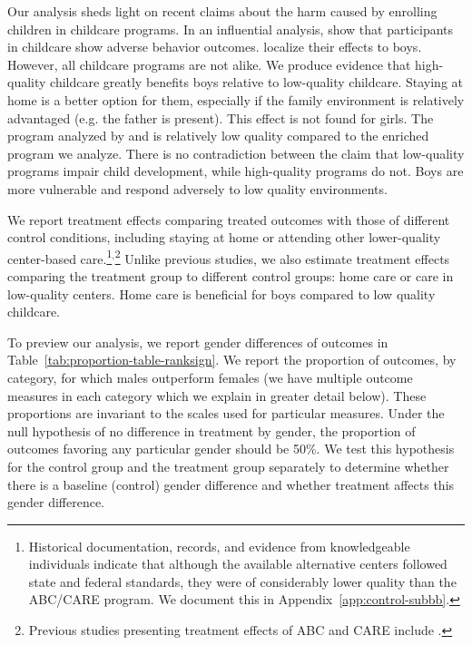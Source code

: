 Our analysis sheds light on recent claims about the harm caused by enrolling children in childcare programs. In an influential analysis, \citet{Baker_Gruber_etal_2008_JPE} show that participants in childcare show adverse behavior outcomes. \citet{Kottelenberg-Lehrer_2014_Gender-Effects} localize their effects to boys. However, all childcare programs are not alike. We produce evidence that high-quality childcare greatly benefits boys relative to low-quality childcare. Staying at home is a better option for them, especially if the family environment is relatively advantaged (e.g. the father is present). This effect is not found for girls. The program analyzed by \citet{Baker_Gruber_Milligan_2015_Noncog_Defects} and \citet{Kottelenberg-Lehrer_2014_Gender-Effects} is relatively low quality compared to the enriched program we analyze. There is no contradiction between the claim that low-quality programs impair child development, while high-quality programs do not. Boys are more vulnerable and respond adversely to low quality environments.

We report treatment effects comparing treated outcomes with those of different control conditions, including staying at home or attending other lower-quality center-based care.\footnote{Historical documentation, records, and evidence from knowledgeable individuals indicate that although the available alternative centers followed state and federal standards, they were of considerably lower quality than the ABC/CARE program. We document this in Appendix~\ref{app:control-subbb}.}$^,$\footnote{Previous studies presenting treatment effects of ABC and CARE include \citet{Ramey_etal_1985_Project-CARE_TiECSE,Clarke_Campbell_1998_ABC_Comparison_ECRQ,Campbell_Pungello_etal_2001_DP,Campbell_Ramey_etal_2002_ADS,Campbell_Wasik_etal_2008_ECRQ,Campbell_Conti_etal_2014_EarlyChildhoodInvestments}.} Unlike previous studies, we also estimate treatment effects comparing the treatment group to different control groups: home care or care in low-quality centers. Home care is beneficial for boys compared to low quality childcare.

To preview our analysis, we report gender differences of outcomes in Table~\ref{tab:proportion-table-ranksign}. We report the proportion of outcomes, by category, for which males outperform females (we have multiple outcome measures in each category which we explain in greater detail below). These proportions are invariant to the scales used for particular measures. Under the null hypothesis of no difference in treatment by gender, the proportion of outcomes favoring any particular gender should be 50\%. We test this hypothesis for the control group and the treatment group separately to determine whether there is a baseline (control) gender difference and whether treatment affects this gender difference.

